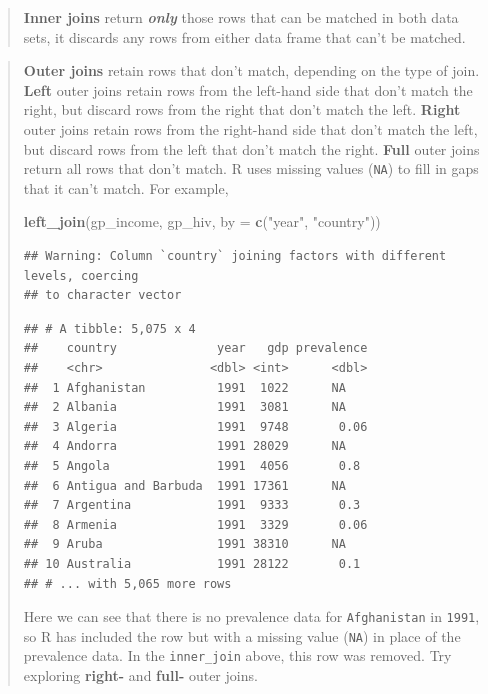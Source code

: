 \documentclass[]{book}
\newenvironment{Shaded}{\begin{snugshade}}{\end{snugshade}}
\newcommand{\KeywordTok}[1]{\textcolor[rgb]{0.13,0.29,0.53}{\textbf{{#1}}}}
\newcommand{\DataTypeTok}[1]{\textcolor[rgb]{0.13,0.29,0.53}{{#1}}}
\newcommand{\StringTok}[1]{\textcolor[rgb]{0.31,0.60,0.02}{{#1}}}
\newcommand{\NormalTok}[1]{{#1}}
\theoremstyle{definition}
\theoremstyle{definition}
\theoremstyle{definition}
\theoremstyle{remark}
\begin{document}
\begin{quote}
\textbf{Inner joins} return \textbf{\emph{only}} those rows that can be
matched in both data sets, it discards any rows from either data frame
that can't be matched.
\end{quote}

\begin{quote}
\textbf{Outer joins} retain rows that don't match, depending on the type
of join. \textbf{Left} outer joins retain rows from the left-hand side
that don't match the right, but discard rows from the right that don't
match the left. \textbf{Right} outer joins retain rows from the
right-hand side that don't match the left, but discard rows from the
left that don't match the right. \textbf{Full} outer joins return all
rows that don't match. R uses missing values (\texttt{NA}) to fill in
gaps that it can't match. For example,

\begin{Shaded}
\begin{Highlighting}[]
\KeywordTok{left_join}\NormalTok{(gp_income, gp_hiv, }\DataTypeTok{by =} \KeywordTok{c}\NormalTok{(}\StringTok{"year"}\NormalTok{, }\StringTok{"country"}\NormalTok{))}
\end{Highlighting}
\end{Shaded}

\begin{verbatim}
## Warning: Column `country` joining factors with different levels, coercing
## to character vector
\end{verbatim}

\begin{verbatim}
## # A tibble: 5,075 x 4
##    country              year   gdp prevalence
##    <chr>               <dbl> <int>      <dbl>
##  1 Afghanistan          1991  1022      NA   
##  2 Albania              1991  3081      NA   
##  3 Algeria              1991  9748       0.06
##  4 Andorra              1991 28029      NA   
##  5 Angola               1991  4056       0.8 
##  6 Antigua and Barbuda  1991 17361      NA   
##  7 Argentina            1991  9333       0.3 
##  8 Armenia              1991  3329       0.06
##  9 Aruba                1991 38310      NA   
## 10 Australia            1991 28122       0.1 
## # ... with 5,065 more rows
\end{verbatim}

Here we can see that there is no prevalence data for
\texttt{Afghanistan} in \texttt{1991}, so R has included the row but
with a missing value (\texttt{NA}) in place of the prevalence data. In
the \texttt{inner\_join} above, this row was removed. Try exploring
\textbf{right-} and \textbf{full-} outer joins.


\end{quote}
\end{document}
